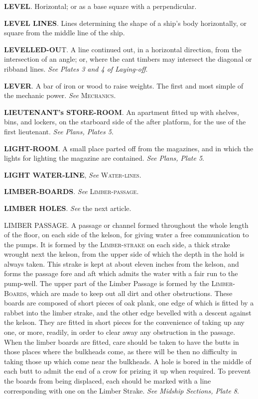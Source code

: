 \textbf{LEVEL}. Horizontal; or as a base square with a perpendicular. 

\textbf{LEVEL LINES}. Lines determining the shape of a ship's body horizontally, or square from the middle line of the ship. 

\textbf{LEVELLED-OU}T. A line continued out, in a horizontal direction, from the intersection of an angle; or, where the cant timbers may intersect the diagonal or ribband lines. \textit{See Plates 3 and 4 of Laying-off}. 

\textbf{LEVER}. A bar of iron or wood to raise weights. The first and most simple of the mechanic power. \textit{See} \textsc{Mechanics}. 

\textbf{LIEUTENANT's STORE-ROOM}. An apartment fitted up with shelves, bins, and lockers, on the starboard side of the after platform, for the use of the first lieutenant. \textit{See Plans, Plates 5}. 

\textbf{LIGHT-ROOM}. A small place parted off from the magazines, and in which the lights for lighting the magazine are contained. \textit{See Plans, Plate 5}. 

\textbf{LIGHT WATER-LINE}, \textit{See} \textsc{Water-lines}.

\textbf{LIMBER-BOARDS}. \textit{See} \textsc{Limber-passage}. 

\textbf{LIMBER HOLES}. \textit{See} the next article. 

LIMBER PASSAGE. A passage or channel formed throughout the whole length of the floor, on each side of the kelson, for giving water a free communication to the pumps. It is formed by the  \textsc{Limber-strake} on each side, a thick strake wrought next the kelson, from the upper side of which the depth in the hold is always taken. This strake is kept at about eleven inches from the kelson, and forms the passage fore and aft which admits the water with a fair run to the pump-well. The upper part of the Limber Passage is formed by the \textsc{Limber-Boards}, which are made to keep out all dirt and other obstructions. These boards are composed of short pieces of oak plank, one edge of which is fitted by a rabbet into the limber strake, and the other edge bevelled with a descent against the kelson. They are fitted in short pieces for the convenience of taking up any one, or more, readily, in order to clear away any obstruction in the passage. When the limber boards are fitted, care should be taken to have the butts in those places where the bulkheads come, as there will be then no difficulty in taking those up which come near the bulkheads. A hole is bored in the middle of each butt to admit the end of a crow for prizing it up when required. To prevent the boards from being displaced, each should be marked with a line corresponding with one on the Limber Strake. \textit{See Midship Sections, Plate 8}. 

